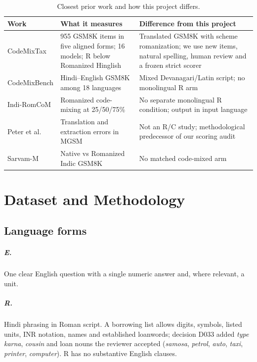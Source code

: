 \documentclass[12pt,a4paper,oneside]{report}
\renewcommand{\_}{\oldunderscore\allowbreak}
\begin{document}
\begin{table}[t]
\centering\small
\caption{Closest prior work and how this project differs.}
\label{tab:positioning}
\begin{tabularx}{\linewidth}{@{}p{2.6cm}LL@{}}
\toprule
Work & What it measures & Difference from this project\\
\midrule
CodeMixTax & 955 GSM8K items in five aligned forms; 16 models; R below Romanized Hinglish & Translated GSM8K with scheme romanization; we use new items, natural spelling, human review and a frozen strict scorer\\
CodeMixBench & Hindi--English GSM8K among 18 languages & Mixed Devanagari/Latin script; no monolingual R arm\\
Indi-RomCoM & Romanized code-mixing at 25/50/75\% & No separate monolingual R condition; output in input language\\
Peter et al. & Translation and extraction errors in MGSM & Not an R/C study; methodological predecessor of our scoring audit\\
Sarvam-M & Native vs Romanized Indic GSM8K & No matched code-mixed arm\\
\bottomrule
\end{tabularx}
\end{table}

\chapter{Dataset and Methodology}
\label{ch:method}

\section{Language forms}
\label{sec:forms}

\paragraph{E.} One clear English question with a single numeric answer and, where relevant, a unit.

\paragraph{R.} Hindi phrasing in Roman script. A borrowing list allows digits, symbols, listed units, INR notation, names and established loanwords; decision D033 added \emph{type karna}, \emph{cousin} and loan nouns the reviewer accepted (\emph{samosa}, \emph{petrol}, \emph{auto}, \emph{taxi}, \emph{printer}, \emph{computer}). R has no substantive English clauses.
\end{document}
